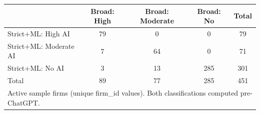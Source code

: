 \begin{tabular}{lccc|c}\hline\hline
 & Broad: High & Broad: Moderate & Broad: No & Total \\\hline
Strict+ML: High AI &   79 &    0 &    0 &   79 \\
Strict+ML: Moderate AI &    7 &   64 &    0 &   71 \\
Strict+ML: No AI &    3 &   13 &  285 &  301 \\\hline
Total &   89 &   77 &  285 &  451 \\\hline\hline
\multicolumn{5}{l}{\footnotesize Active sample firms (unique firm\_id values). Both classifications computed pre-ChatGPT.}
\end{tabular}
